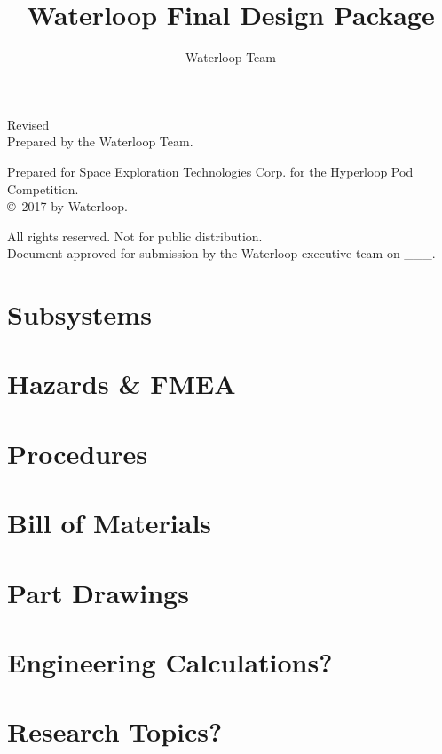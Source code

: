 \documentclass{report}
\author{Waterloop Team}
\title{Waterloop Final Design Package}
\date{\displaydate{date}}
\begin{document}
    \maketitle
    Revised \\

    Prepared by the Waterloop Team.

    Prepared for Space Exploration Technologies Corp. for the Hyperloop Pod Competition.\\

    \copyright \ 2017 by Waterloop.

    All rights reserved. Not for public distribution.\\

    Document approved for submission by the Waterloop executive team on \_\_\_.

    \tableofcontents
    \newpage

    
    


    \chapter{Subsystems}

    
    
    
    
    
    
    
    

    \begin{appendices}
        \makeatletter
        \makeatother

        \chapter{Hazards \& FMEA}
        \chapter{Procedures}
        \chapter{Bill of Materials}
        \chapter{Part Drawings}
        \chapter{Engineering Calculations?}
        \chapter{Research Topics?}
    \end{appendices}
\end{document}
